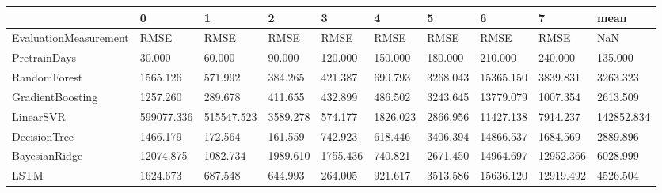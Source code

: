 \begin{tabular}{llllllllll}
\toprule
{} &          0 &          1 &        2 &        3 &        4 &        5 &         6 &         7 &       mean \\
\midrule
EvaluationMeasurement &       RMSE &       RMSE &     RMSE &     RMSE &     RMSE &     RMSE &      RMSE &      RMSE &        NaN \\
PretrainDays          &     30.000 &     60.000 &   90.000 &  120.000 &  150.000 &  180.000 &   210.000 &   240.000 &    135.000 \\
RandomForest          &   1565.126 &    571.992 &  384.265 &  421.387 &  690.793 & 3268.043 & 15365.150 &  3839.831 &   3263.323 \\
GradientBoosting      &   1257.260 &    289.678 &  411.655 &  432.899 &  486.502 & 3243.645 & 13779.079 &  1007.354 &   2613.509 \\
LinearSVR             & 599077.336 & 515547.523 & 3589.278 &  574.177 & 1826.023 & 2866.956 & 11427.138 &  7914.237 & 142852.834 \\
DecisionTree          &   1466.179 &    172.564 &  161.559 &  742.923 &  618.446 & 3406.394 & 14866.537 &  1684.569 &   2889.896 \\
BayesianRidge         &  12074.875 &   1082.734 & 1989.610 & 1755.436 &  740.821 & 2671.450 & 14964.697 & 12952.366 &   6028.999 \\
LSTM                  &   1624.673 &    687.548 &  644.993 &  264.005 &  921.617 & 3513.586 & 15636.120 & 12919.492 &   4526.504 \\
\bottomrule
\end{tabular}
